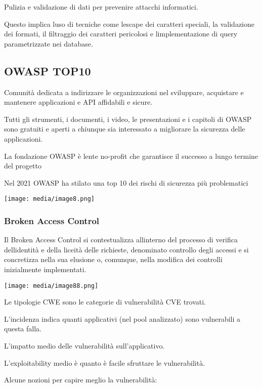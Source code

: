 Pulizia e validazione di dati per prevenire attacchi informatici.

Questo implica l\textquotesingle uso di tecniche come
l\textquotesingle escape dei caratteri speciali, la validazione dei
formati, il filtraggio dei caratteri pericolosi e
l\textquotesingle implementazione di query parametrizzate nei database.

\subsection{OWASP TOP10}\label{owasp-top10}

Comunità dedicata a indirizzare le organizzazioni nel sviluppare,
acquistare e mantenere applicazioni e API affidabili e sicure.

Tutti gli strumenti, i documenti, i video, le presentazioni e i capitoli
di OWASP sono gratuiti e aperti a chiunque sia interessato a migliorare
la sicurezza delle applicazioni.

La fondazione OWASP è l\textquotesingle ente no-profit che garantisce il
successo a lungo termine del progetto

Nel 2021 OWASP ha stilato una top 10 dei rischi di sicurezza più
problematici

\texttt{[image: media/image8.png]}

\subsubsection{Broken Access Control}\label{broken-access-control}

Il Broken Access Control si contestualizza all\textquotesingle interno
del processo di verifica dell\textquotesingle identità e della liceità
delle richieste, denominato controllo degli accessi e si concretizza
nella sua elusione o, comunque, nella modifica dei controlli
inizialmente implementati.

\texttt{[image: media/image88.png]}

Le tipologie CWE sono le categorie di vulnerabilità CVE trovati.

L'incidenza indica quanti applicativi (nel pool analizzato) sono
vulnerabili a questa falla.

L'impatto medio delle vulnerabilità sull'applicativo.

L'exploitability medio è quanto è facile sfruttare le vulnerabilità.

Alcune nozioni per capire meglio la vulnerabilità:

